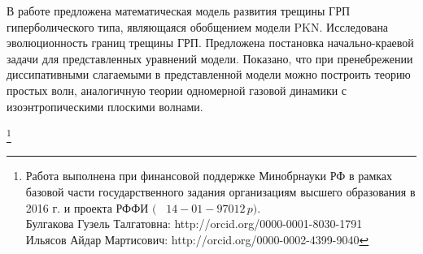 
В работе предложена математическая модель развития трещины ГРП гиперболического типа, являющаяся обобщением модели PKN. Исследована эволюционность границ трещины ГРП. Предложена постановка начально-краевой задачи для представленных уравнений модели. Показано, что при пренебрежении диссипативными слагаемыми в представленной модели можно построить теорию простых волн, аналогичную теории одномерной газовой динамики с изоэнтропическими плоскими волнами.



{\thanks{Работа выполнена при финансовой поддержке Минобрнауки РФ в рамках базовой части государственного задания организациям высшего образования в 2016 г. и проекта РФФИ $($ \rm \No~$14{-}01{-}97012\,p).$ \\ Булгакова Гузель Талгатовна: http://orcid.org/0000-0001-8030-1791\\

Ильясов Айдар Мартисович:   http://orcid.org/0000-0002-4399-9040

}}




\newpage

